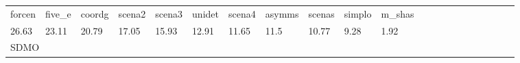 \begin{table}
\begin{center}
\begin{tabular}{lllllllllllllllllllll}
    
    
    forcen
    
    
    &
    
    five_e
    
    
    &
    
    coordg
    
    
    &
    
    scena2
    
    
    &
    
    scena3
    
    
    &
    
    unidet
    
    
    &
    
    scena4
    
    
    &
    
    asymms
    
    
    &
    
    scenas
    
    
    &
    
    simplo
    
    
    &
    
    m_shas
     \\

    
    
    26.63
    
    
    &
    
    23.11
    
    
    &
    
    20.79
    
    
    &
    
    17.05
    
    
    &
    
    15.93
    
    
    &
    
    12.91
    
    
    &
    
    11.65
    
    
    &
    
    11.5
    
    
    &
    
    10.77
    
    
    &
    
    9.28
    
    
    &
    
    1.92
     \\


\hline
\multicolumn{ 11 }{l}{ SDMO }\\ \hline



\end{tabular}
\end{center}
\end{table}
